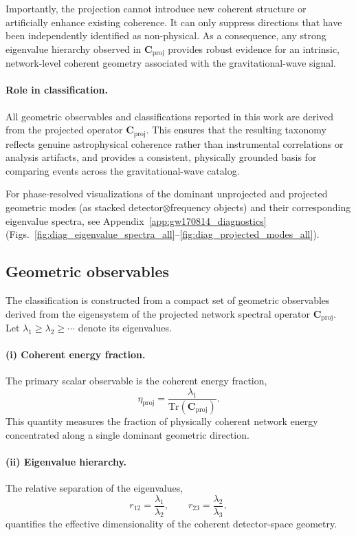 \documentclass[11pt,a4paper]{article}
\begin{document}
Importantly, the projection cannot introduce new coherent structure or artificially
enhance existing coherence.
It can only suppress directions that have been independently identified as
non-physical.
As a consequence, any strong eigenvalue hierarchy observed in
$\mathbf{C}_{\mathrm{proj}}$ provides robust evidence for an intrinsic, network-level
coherent geometry associated with the gravitational-wave signal.

\paragraph{Role in classification.}
All geometric observables and classifications reported in this work are derived from the
projected operator $\mathbf{C}_{\mathrm{proj}}$.
This ensures that the resulting taxonomy reflects genuine astrophysical coherence rather
than instrumental correlations or analysis artifacts, and provides a consistent,
physically grounded basis for comparing events across the gravitational-wave catalog.

For phase-resolved visualizations of the dominant unprojected and projected geometric modes (as stacked detector$\otimes$frequency objects) and their corresponding eigenvalue spectra, see Appendix~\ref{app:gw170814_diagnostics} (Figs.~\ref{fig:diag_eigenvalue_spectra_all}--\ref{fig:diag_projected_modes_all}).


\subsection{Geometric observables}

The classification is constructed from a compact set of geometric observables derived
from the eigensystem of the projected network spectral operator
$\mathbf{C}_{\mathrm{proj}}$.
Let $\lambda_1 \ge \lambda_2 \ge \cdots$ denote its eigenvalues.

\paragraph{(i) Coherent energy fraction.}
The primary scalar observable is the coherent energy fraction,
\begin{equation}
\eta_{\mathrm{proj}} = \frac{\lambda_1}{\mathrm{Tr}(\mathbf{C}_{\mathrm{proj}})} .
\end{equation}
This quantity measures the fraction of physically coherent network energy concentrated
along a single dominant geometric direction.

\paragraph{(ii) Eigenvalue hierarchy.}
The relative separation of the eigenvalues,
\begin{equation}
r_{12} = \frac{\lambda_1}{\lambda_2}, \qquad
r_{23} = \frac{\lambda_2}{\lambda_3},
\end{equation}
quantifies the effective dimensionality of the coherent detector-space geometry.
\end{document}
